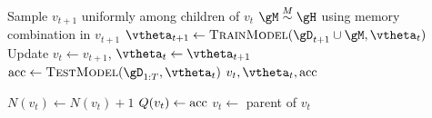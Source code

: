 \begin{algorithm}[ht!]
\begin{algorithmic}[1]
    \State Sample $v_{t+1}$ uniformly among children of $v_t$
    \State $\gM \stackrel{M}{\sim} \gH$ using memory combination in $v_{t+1}$
    \State $\vtheta_{t+1} \leftarrow \textsc{TrainModel}(\gD_{t+1} \cup \gM, \vtheta_{t})$
    \State Update $v_{t} \leftarrow v_{t+1}$, $\vtheta_{t} \leftarrow \vtheta_{t+1}$
\EndWhile
\State $\textnormal{acc} \leftarrow \textsc{TestModel}(\gD_{1:T}, \vtheta_{t})$
\State \Return $v_t, \vtheta_t, \textnormal{acc}$
\EndFunction

\Statex

    \State $N(v_t) \leftarrow N(v_t)+1$
    \State $Q(v_t) \leftarrow \textnormal{acc}$
    \State $v_t \leftarrow$ parent of $v_t$
\EndWhile
\EndFunction
\end{algorithmic}
\end{algorithm}
